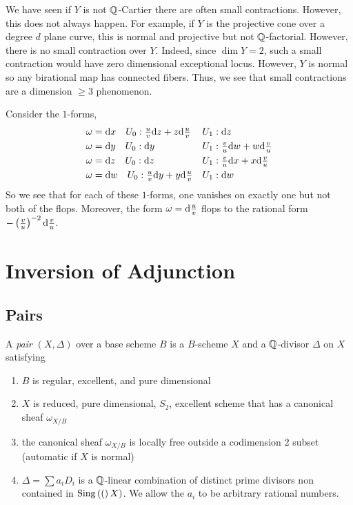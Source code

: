 \documentclass[12pt]{article}
\begin{document}
\begin{rmk}
We have seen if $Y$ is not $\mathbb{Q}$-Cartier there are often small contractions. However, this does not always happen. For example, if $Y$ is the projective cone over a degree $d$ plane curve, this is normal and projective but not $\mathbb{Q}$-factorial. However, there is no small contraction over $Y$. Indeed, since $\dim{Y} = 2$, such a small contraction would have zero dimensional exceptional locus. However, $Y$ is normal so any birational map has connected fibers. Thus, we see that small contractions are a dimension $\ge 3$ phenomenon. 
\end{rmk}

\begin{example}
Consider the $1$-forms,
\begin{align*}
\omega &= \mathrm{d}{x} \quad U_0 : \tfrac{u}{v} \mathrm{d}{z} + z \mathrm{d}{\tfrac{u}{v}} && U_1 : \mathrm{d}{z}
\\
\omega &= \mathrm{d}{y} \quad U_0 : \mathrm{d}{y} &&  U_1 : \tfrac{v}{u} \mathrm{d}{w} + w \mathrm{d}{\tfrac{v}{u}} 
\\
\omega &= \mathrm{d}{z} \quad U_0 : \mathrm{d}{z} && U_1 : \tfrac{v}{u} \mathrm{d}{x} + x \mathrm{d}{\tfrac{v}{u}} 
\\
\omega &= \mathrm{d}{w} \quad U_0 : \tfrac{u}{v} \mathrm{d}{y} + y \mathrm{d}{\tfrac{u}{v}} &&  U_1 : \mathrm{d}{w}
\end{align*}
So we see that for each of these $1$-forms, one vanishes on exactly one but not both of the flops. Moreover, the form $\omega = \mathrm{d}{\tfrac{u}{v}}$ flops to the rational form $- \left( \tfrac{v}{u} \right)^{-2} \mathrm{d}{\tfrac{v}{u}}$.
\end{example}


\section{Inversion of Adjunction}


\subsection{Pairs}

\begin{defn}
A \textit{pair} $(X, \Delta)$ over a base scheme $B$ is a $B$-scheme $X$ and a $\mathbb{Q}$-divisor $\Delta$ on $X$ satisfying
\begin{enumerate}
\item $B$ is regular, excellent, and pure dimensional
\item $X$ is reduced, pure dimensional, $S_2$, excellent scheme that has a canonical sheaf $\omega_{X/B}$
\item the canonical sheaf $\omega_{X/B}$ is locally free outside a codimension $2$ subset (automatic if $X$ is normal)
\item $\Delta = \sum a_i D_i$ is a $\mathbb{Q}$-linear combination of distinct prime divisors non contained in $\mathrm{Sing}\left( ( \right)X)$. We allow the $a_i$ to be arbitrary rational numbers. 
\end{enumerate}
\end{defn}
\end{document}

